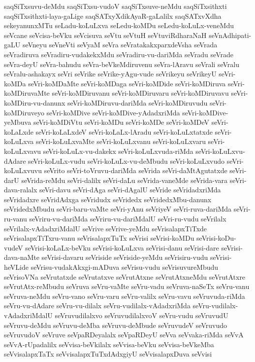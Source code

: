 {saqSiTxsuvu-deMdu
saqSiTxsu-vudoV
saqSiTxsuve-neMdu
saqSiTxsithxti
saqSiTxsithxti-laya-gaLige
saqSATxyXdikAyaR-gaLalilx
saqSATxvXdha
sekeyanunxMTu
seLadu-koLuLxva
seLedu-koMDu
seLedu-koLuLx-veneMdu
seVcane
seVcisa-beVku
seVcisuva
seVtu
seVtuH
seVtuviRdharaNaH
seVnAdhipati-gaLU
seVneyu
seVneVti
seVyaM
seVra
seVratakakxparxdeVsha
seVrada
seVradiruva
seVradiru-vudakekxMdu
seVradiru-vu-dariMda
seVradu
seVrade
seVra-deyU
seVra-bahudu
seVra-beVkeMdiruvenu
seVra-lAravu
seVrali
seVralu
seVralu-ashakayx
seVri
seVrike
seVrike-yAgu-vude
seVrikeyu
seVrikeyU
seVri-koMDa
seVri-koMDaMte
seVri-koMDaga
seVri-koMDide
seVri-koMDiruva
seVri-koMDiruvaMte
seVri-koMDiruvanu
seVri-koMDiruvaru
seVri-koMDiruvavu
seVri-koMDiru-vu-danunx
seVri-koMDiruvu-dariMda
seVri-koMDiruvudu
seVri-koMDiruveyo
seVri-koMDive
seVri-koMDive-yAdadxriMda
seVri-koMDive-yeMbuva
seVri-koMDiVtu
seVri-koMDu
seVri-koMDe
seVri-koMDeV
seVri-koLaLxde
seVri-koLaLxdeV
seVri-koLaLx-lAradu
seVri-koLuLxtatxde
seVri-koLuLxva
seVri-koLuLxvaMte
seVri-koLuLxvanu
seVri-koLuLxvaru
seVri-koLuLxvavu
seVri-koLuLx-vu-dakekx
seVri-koLuLxvuda-riMda
seVri-koLuLxvu-dAdare
seVri-koLuLx-vudu
seVri-koLuLx-vu-deMbudu
seVri-koLuLxvudo
seVri-koLuLxvuvu
seVrito
seVri-toVruvu-dariMda
seVrida
seVri-daMtAgutatxde
seVri-darU
seVrida-reMdu
seVri-dalilx
seVri-daLu
seVrida-vaneMde
seVrida-vara
seVri-dava-ralalx
seVri-davu
seVri-dAga
seVri-dAgalU
seVride
seVridadxriMda
seVridadxre
seVridAdxga
seVridudx
seVridedx
seVridedxMbu-danunx
seVridedxMbudu
seVri-baru-vaMte
seVri-yAnu
seVriyeV
seVri-ruva-dariMda
seVri-ru-vanu
seVriru-vu-dariMda
seVriru-vu-dariMdalU
seVri-ru-vudu
seVrilalx
seVrilalx-vAdadxriMdalU
seVrive
seVrive-yeMdu
seVrisalapxTiTxde
seVrisalapxTiTxru-vanu
seVrisalapxTuTx
seVrisi
seVrisi-koMDu
seVrisi-koDu-vudeV
seVrisi-koLaLx-beVku
seVrisi-koLuLxva
seVrisi-danu
seVrisi-dare
seVrisi-dava-naMte
seVrisi-davaru
seVriside
seVriside-yeMdu
seVrisiru-vudu
seVrisi-heVLide
seVrisu-vudakAkxgi-mADuva
seVrisu-vudu
seVrisuvureMbudu
seVrisoVNa
seVrutatxde
seVrutatxve
seVrutAtxne
seVrutAtxneMdu
seVrutAtxre
seVrutAtx-reMbudu
seVruva
seVru-vaMte
seVru-vadu
seVruva-naSeTx
seVru-vanu
seVruva-neMdu
seVru-vano
seVru-varu
seVru-valilx
seVru-vavu
seVruvuda-riMda
seVru-vu-dAdare
seVru-vu-dilalx
seVru-vudilalx-vAdadxriMda
seVru-vudilalx-vAdadxriMdalU
seVruvudilalxvo
seVruvudilalxvoV
seVru-vudu
seVruvudU
seVruvu-deMdu
seVruvu-deMba
seVruvu-deMbude
seVruvudeV
seVruvudo
seVruvudoV
seVruve
seVpaRDeyalalx
seVpaRDeyU
seVva
seVvaka-riMda
seVvA
seVvA-rUpadalilx
seVvisa-beVkilalx
seVvisa-beVku
seVvisa-beVkeMba
seVvisalapxTaTx
seVvisalapxTuTxdAdxgiyU
seVvisalapxDuva
seVvisi
}
